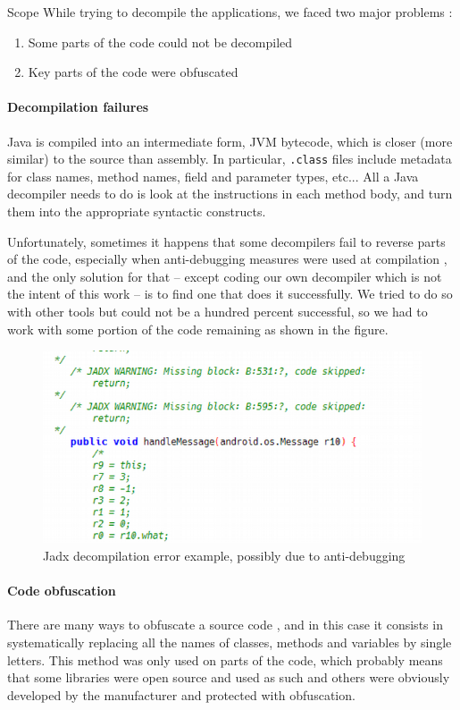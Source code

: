 \begin{chaptercover}{Scope}
\vspace{1cm}
While trying to decompile the applications, we faced two major problems :

\begin{enumerate}
  \item Some parts of the code could not be decompiled
  \item Key parts of the code were obfuscated
\end{enumerate}

\paragraph{Decompilation failures} Java is compiled into an intermediate form, JVM bytecode, which is closer (more similar) to the source than assembly. In particular, \texttt{.class} files include metadata for class names, method names, field and parameter types, etc... All a Java decompiler needs to do is look at the instructions in each method body, and turn them into the appropriate syntactic constructs.

Unfortunately, sometimes it happens that some decompilers fail to reverse parts of the code, especially when anti-debugging measures were used at compilation \cite{anti-debugging}, and the only solution for that -- except coding our own decompiler which is not the intent of this work -- is to find one that does it successfully. We tried to do so with other tools but could not be a hundred percent successful, so we had to work with some portion of the code remaining as shown in the figure.

\begin{figure}[H]
  \centering
  \includegraphics[width=.5\linewidth]{figures/jadx-decompilation-error}
  \caption{Jadx decompilation error example, possibly due to anti-debugging}
\end{figure}

\paragraph{Code obfuscation} There are many ways to obfuscate a source code \cite{code-obfuscation}, and in this case it consists in systematically replacing all the names of classes, methods and variables by single letters. This method was only used on parts of the code, which probably means that some libraries were open source and used as such and others were obviously developed by the manufacturer and protected with obfuscation.


\end{chaptercover}

